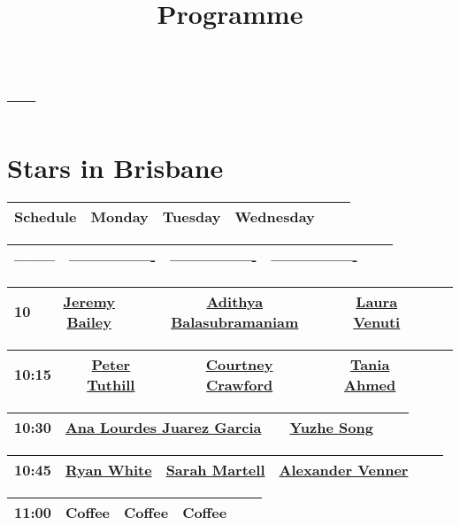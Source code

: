 \documentclass{article}
\begin{document}
\title{Programme}
\maketitle
\section{---}
\section{Stars in Brisbane}
\begin{longtable}{|c | c | c | c | c | c|}
\hline
Schedule & Monday & Tuesday & Wednesday \\
\hline
\end{longtable}
\begin{longtable}{|c | c | c | c | c | c|}
\hline
-------- & ---------------- & ---------------- & ---------------- \\
\hline
\end{longtable}
\begin{longtable}{|c | c | c | c | c | c|}
\hline
10 & \href{speakers/jeremy-bailey/_index.md}{Jeremy Bailey} & \href{speakers/adithya-balasubramaniam/_index.md}{Adithya Balasubramaniam} & \href{speakers/laura-venuti/_index.md}{Laura Venuti} \\
\hline
\end{longtable}
\begin{longtable}{|c | c | c | c | c | c|}
\hline
10:15 & \href{speakers/peter-tuthill/_index.md}{Peter Tuthill} & \href{speakers/courtney-crawford/_index.md}{Courtney Crawford} & \href{speakers/tania-ahmed/_index.md}{Tania Ahmed} \\
\hline
\end{longtable}
\begin{longtable}{|c | c | c | c | c | c|}
\hline
10:30 & \href{speakers/ana-lourdes-juarez-garcia/_index.md}{Ana Lourdes Juarez Garcia} &  & \href{speakers/yuzhe-song/_index.md}{Yuzhe Song} \\
\hline
\end{longtable}
\begin{longtable}{|c | c | c | c | c | c|}
\hline
10:45 & \href{speakers/ryan-white/_index.md}{Ryan White} & \href{speakers/sarah-martell/_index.md}{Sarah Martell} & \href{speakers/alexander-venner/_index.md}{Alexander Venner} \\
\hline
\end{longtable}
\begin{longtable}{|c | c | c | c | c | c|}
\hline
11:00 & Coffee & Coffee & Coffee \\
\hline
\end{longtable}
\end{document}
